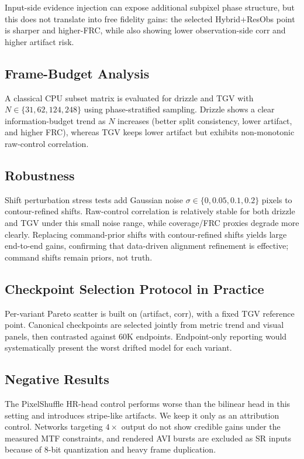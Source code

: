 Input-side evidence injection can expose additional subpixel phase structure,
but this does not translate into free fidelity gains: the selected
Hybrid+ResObs point is sharper and higher-FRC, while also showing lower
observation-side corr and higher artifact risk.

\subsection{Frame-Budget Analysis}

A classical CPU subset matrix is evaluated for drizzle and TGV with
$N\in\{31,62,124,248\}$ using phase-stratified sampling. Drizzle shows a clear
information-budget trend as $N$ increases (better split consistency, lower
artifact, and higher FRC), whereas TGV keeps lower artifact but exhibits
non-monotonic raw-control correlation.

\subsection{Robustness}

Shift perturbation stress tests add Gaussian noise
$\sigma\in\{0,0.05,0.1,0.2\}$ pixels to contour-refined shifts. Raw-control
correlation is relatively stable for both drizzle and TGV under this small
noise range, while coverage/FRC proxies degrade more clearly. Replacing
command-prior shifts with contour-refined shifts yields large end-to-end gains,
confirming that data-driven alignment refinement is effective; command shifts
remain priors, not truth.

\subsection{Checkpoint Selection Protocol in Practice}

Per-variant Pareto scatter is built on (artifact, corr), with a fixed TGV
reference point. Canonical checkpoints are selected jointly from metric trend
and visual panels, then contrasted against 60K endpoints. Endpoint-only
reporting would systematically present the worst drifted model for each
variant.

\subsection{Negative Results}

The PixelShuffle HR-head control performs worse than the bilinear head in this
setting and introduces stripe-like artifacts. We keep it only as an attribution
control. Networks targeting $4\times$ output do not show credible gains under
the measured MTF constraints, and rendered AVI bursts are excluded as SR inputs
because of 8-bit quantization and heavy frame duplication.

